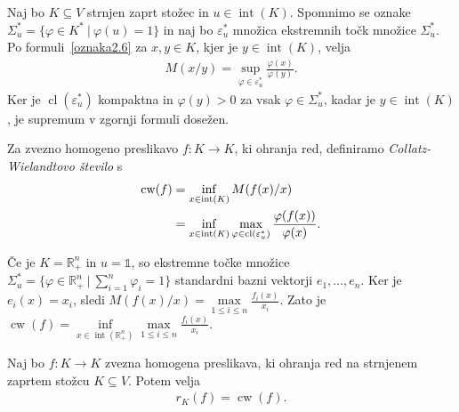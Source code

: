 \documentclass[mat2, tisk]{fmfdelo}
\newcommand{\R}{\mathbb{R}}
\begin{document}
Naj bo $K\subseteq V$ strnjen zaprt stožec in $u\in\operatorname{int}(K)$.
Spomnimo se oznake
$\Sigma_u^*=\{\varphi\in K^* ~|~ \varphi(u)=1\}$ in naj bo
$\varepsilon_u^*$ množica ekstremnih točk množice $\Sigma_u^*$.
Po formuli~\eqref{oznaka2.6} za $x,y\in K$, kjer je
$y\in\operatorname{int}(K)$, velja
\begin{align*}
M(x/y)
=
\sup_{\varphi\in\varepsilon_u^*}
\frac{\varphi(x)}{\varphi(y)}.
\end{align*}
Ker je $\operatorname{cl}(\varepsilon_u^*)$ kompaktna in
$\varphi(y)>0$ za vsak $\varphi\in\Sigma_u^*$, kadar je
$y\in\operatorname{int}(K)$, je supremum v zgornji
formuli dosežen.

\begin{definicija}
  Za zvezno homogeno preslikavo $f\colon K\longrightarrow K$, ki ohranja
  red, definiramo \emph{Collatz-Wielandtovo število} s
  \begin{align}
  \operatorname{cw}(f)
  &=
  \inf_{x\in\operatorname{int}(K)} M(f(x)/x) \notag\\
  &=
  \inf_{x\in\operatorname{int}(K)}
  \max_{\varphi\in\operatorname{cl}(\varepsilon_u^*)}
  \frac{\varphi(f(x))}{\varphi(x)}.
  \label{eq:collatz-wielandt-stevilo}
  \end{align}
\end{definicija}


Če je $K=\R_+^n$ in $u=\mathds{1}$, so ekstremne točke množice
$\Sigma_u^*=\{\varphi\in\R_+^n ~|~\sum_{i=1}^n\varphi_i=1\}$
standardni bazni vektorji $e_1,\ldots,e_n$. Ker je
$e_i(x)=x_i$, sledi
$M(f(x)/x)=\max\limits_{1\leq i\leq n}\frac{f_i(x)}{x_i}$.
Zato je
$\operatorname{cw}(f)=
\inf\limits_{x\in\operatorname{int}(\R_+^n)}
\max\limits_{1\leq i\leq n}\frac{f_i(x)}{x_i}$.

\begin{izrek}\label{izr:collatz-wielandt}
  Naj bo $f\colon K\longrightarrow K$ zvezna homogena preslikava, ki
  ohranja red na strnjenem zaprtem stožcu $K\subseteq V$. Potem velja
  \begin{align*}
  r_K(f)=\operatorname{cw}(f).
  \end{align*}
\end{izrek}
\end{document}
